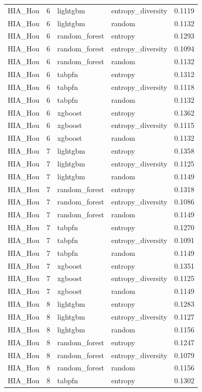 \begin{tabular}{lrllr}
HIA_Hou & 6 & lightgbm & entropy_diversity & 0.1119 \\
HIA_Hou & 6 & lightgbm & random & 0.1132 \\
HIA_Hou & 6 & random_forest & entropy & 0.1293 \\
HIA_Hou & 6 & random_forest & entropy_diversity & 0.1094 \\
HIA_Hou & 6 & random_forest & random & 0.1132 \\
HIA_Hou & 6 & tabpfn & entropy & 0.1312 \\
HIA_Hou & 6 & tabpfn & entropy_diversity & 0.1118 \\
HIA_Hou & 6 & tabpfn & random & 0.1132 \\
HIA_Hou & 6 & xgboost & entropy & 0.1362 \\
HIA_Hou & 6 & xgboost & entropy_diversity & 0.1115 \\
HIA_Hou & 6 & xgboost & random & 0.1132 \\
HIA_Hou & 7 & lightgbm & entropy & 0.1358 \\
HIA_Hou & 7 & lightgbm & entropy_diversity & 0.1125 \\
HIA_Hou & 7 & lightgbm & random & 0.1149 \\
HIA_Hou & 7 & random_forest & entropy & 0.1318 \\
HIA_Hou & 7 & random_forest & entropy_diversity & 0.1086 \\
HIA_Hou & 7 & random_forest & random & 0.1149 \\
HIA_Hou & 7 & tabpfn & entropy & 0.1270 \\
HIA_Hou & 7 & tabpfn & entropy_diversity & 0.1091 \\
HIA_Hou & 7 & tabpfn & random & 0.1149 \\
HIA_Hou & 7 & xgboost & entropy & 0.1351 \\
HIA_Hou & 7 & xgboost & entropy_diversity & 0.1125 \\
HIA_Hou & 7 & xgboost & random & 0.1149 \\
HIA_Hou & 8 & lightgbm & entropy & 0.1283 \\
HIA_Hou & 8 & lightgbm & entropy_diversity & 0.1127 \\
HIA_Hou & 8 & lightgbm & random & 0.1156 \\
HIA_Hou & 8 & random_forest & entropy & 0.1247 \\
HIA_Hou & 8 & random_forest & entropy_diversity & 0.1079 \\
HIA_Hou & 8 & random_forest & random & 0.1156 \\
HIA_Hou & 8 & tabpfn & entropy & 0.1302 \\

\end{tabular}
